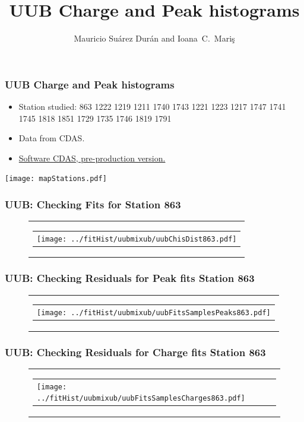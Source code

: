 \documentclass[aspectratio=169]{beamer}
\title{UUB Charge and Peak histograms}
\author{
  Mauricio Su\'arez Dur\'an and Ioana~C.~Mari\c{s}
}
\institute{IIHE-ULB}
\begin{document}
\begin{frame}
  \titlepage
\end{frame}


\begin{frame}
	\frametitle{UUB Charge and Peak histograms}
	\begin{itemize}
		\item Station studied: 863 1222 1219 1211 1740 1743 1221 1223 1217 1747 1741 1745 1818 1851 1729 1735 1746 1819 1791
		\item Data from CDAS.
		\item {\underline {Software CDAS, pre-production version.}}
	\end{itemize}
	\centering
	\texttt{[image: mapStations.pdf]}
\end{frame}


\begin{frame}
  \frametitle{UUB: Checking Fits for Station 863}
  \begin{figure}
    \centering
    \begin{tabularx}{\textwidth}{C}
      \begin{tabular}{l}
        \texttt{[image: ../fitHist/uubmixub/uubChisDist863.pdf]}
      \end{tabular}
    \end{tabularx}
  \end{figure}
\end{frame}

\begin{frame}
  \frametitle{UUB: Checking Residuals for Peak fits Station 863}
  \begin{figure}
    \centering
    \begin{tabularx}{\textwidth}{C}
      \begin{tabular}{l}
        \texttt{[image: ../fitHist/uubmixub/uubFitsSamplesPeaks863.pdf]}
      \end{tabular}
    \end{tabularx}
  \end{figure}
\end{frame}

\begin{frame}
  \frametitle{UUB: Checking Residuals for Charge fits Station 863}
  \begin{figure}
    \centering
    \begin{tabularx}{\textwidth}{C}
      \begin{tabular}{l}
        \texttt{[image: ../fitHist/uubmixub/uubFitsSamplesCharges863.pdf]}
      \end{tabular}
    \end{tabularx}
  \end{figure}
\end{frame}
\end{document}
